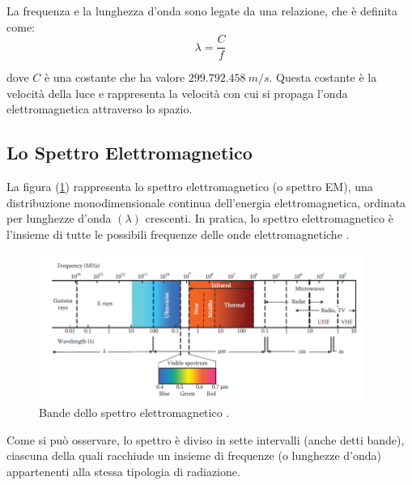 La frequenza e la lunghezza d’onda sono legate da una relazione, che è definita come:
\begin{equation}
    \lambda = \frac{C}{f}
\end{equation}

dove $C$ è una costante che ha valore $\textit{299.792.458}\ m/s$. Questa costante 
è la velocità della luce e rappresenta la velocità con cui si propaga 
l'onda elettromagnetica attraverso lo spazio. 

\newpage
\subsection{Lo Spettro Elettromagnetico}
La figura (\ref{fig:BandeSpettroElettromagnetico}) rappresenta lo spettro
elettromagnetico (o spettro EM), una distribuzione monodimensionale 
continua dell’energia elettromagnetica, ordinata per lunghezze d’onda $(\lambda)$ crescenti.  
In pratica, lo spettro elettromagnetico è l’insieme di tutte le possibili 
frequenze delle onde elettromagnetiche \cite{spetto_magnetico}.

\begin{figure}[H]
    \centering
    \includegraphics[width=0.95\textwidth]{Immagini/Generiche/BandeSpettroElettromagnetico.png}
    \caption{Bande dello spettro elettromagnetico \cite{SPETTRO_IMG} .}
    \label{fig:BandeSpettroElettromagnetico}
\end{figure}

Come si può osservare, lo spettro è diviso in sette intervalli (anche detti bande),
ciascuna della quali racchiude un insieme di frequenze (o lunghezze d’onda) 
appartenenti alla stessa tipologia di radiazione.


